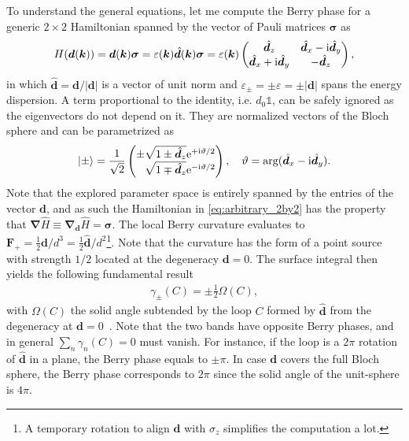 To understand the general equations, let me compute the Berry phase for a generic $2\times 2$ Hamiltonian spanned by the vector of Pauli matrices $\bm\sigma$ as
\begin{align}
    H(\bm d(\bm k)) = \bm d(\bm k) \bm\sigma = \varepsilon(\bm k) \hat{\bm d}(\bm k)\bm\sigma
    =
    \varepsilon(\bm k)
    \begin{pmatrix}
        \hat{\bm d}_z & \hat{\bm d}_x - \mathrm i \hat{\bm d}_y \\
        \hat{\bm d}_x + \mathrm i \hat{\bm d}_y & -\hat{\bm d}_z
    \end{pmatrix},
    \label{eq:arbitrary_2by2}
\end{align}
in which $\hat{\bm d}={\bm d}/|\bm d|$ is a vector of unit norm and $\varepsilon_\pm = \pm\varepsilon = \pm|\bm d|$ spans the energy dispersion.
A term proportional to the identity, i.e. $d_0\mathbb 1$, can be safely ignored as the eigenvectors do not depend on it.
They are normalized vectors of the Bloch sphere and can be parametrized as
\begin{align}
    \ket{\pm} = \frac{1}{\sqrt{2}}
    \begin{pmatrix}
        \pm \sqrt{1 \pm \hat{\bm d}_z}\re^{+\ri\vartheta/2}\\
        \phantom\pm\sqrt{1 \mp \hat{\bm d}_z}\re^{-\ri\vartheta/2}
    \end{pmatrix}
    ,
    \quad
    \vartheta = \arg(\hat{\bm d}_x-\ri \hat{\bm d}_y).
\end{align}
Note that the explored parameter space is entirely spanned by the entries of the vector $\bm d$, and as such the Hamiltonian in \cref{eq:arbitrary_2by2} has the property that $\bm\nabla\hat H \equiv \bm\nabla_{\bm d}\hat H = \bm\sigma$.
The local Berry curvature evaluates to ${\bm F}_+ = \frac12\bm d/d^3=\frac12\hat{\bm d}/d^2$\footnote{A temporary rotation to align $\bm d$ with $\sigma_z$ simplifies the computation a lot.}.
Note that the curvature has the form of a point source with strength $1/2$ located at the degeneracy $\bm d=0$.
The surface integral then yields the following fundamental result
\begin{align}
    \gamma_{\pm}(C) = \pm\frac12\Omega(C),
\end{align}
with $\Omega(C)$ the solid angle subtended by the loop $C$ formed by $\hat {\bm d}$ from the degeneracy at $\bm d=0$~\cite{Berry1984}.
Note that the two bands have opposite Berry phases, and in general $\sum_n\gamma_n(C)=0$ must vanish.
For instance, if the loop is a $2\pi$ rotation of $\hat{\bm d}$ in a plane, the Berry phase equals to $\pm\pi$.
In case $\bm d$ covers the full Bloch sphere, the Berry phase corresponds to $2\pi$ since the solid angle of the unit-sphere is $4\pi$.

